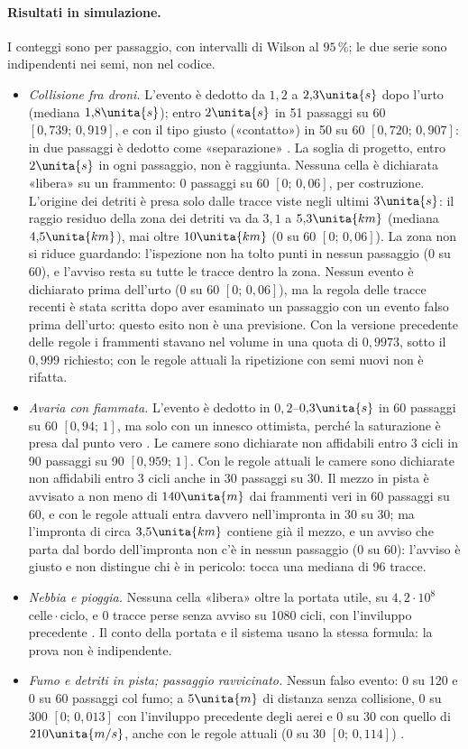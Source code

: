 \paragraph{Risultati in simulazione.} I conteggi sono per passaggio, con intervalli di Wilson al $95\,\%$; le due serie sono indipendenti nei semi, non nel codice.
\begin{itemize}
\item \emph{Collisione fra droni.} L'evento è dedotto da $1{,}2$ a $2{,}3\unita{s}$ dopo l'urto (mediana $1{,}8\unita{s}$); entro $2\unita{s}$ in 51 passaggi su 60 $[0{,}739;\,0{,}919]$, e con il tipo giusto («contatto») in 50 su 60 $[0{,}720;\,0{,}907]$: in due passaggi è dedotto come «separazione» . La soglia di progetto, entro $2\unita{s}$ in ogni passaggio, non è raggiunta. Nessuna cella è dichiarata «libera» su un frammento: 0 passaggi su 60 $[0;\,0{,}06]$, per costruzione. L'origine dei detriti è presa solo dalle tracce viste negli ultimi $3\unita{s}$: il raggio residuo della zona dei detriti va da $3{,}1$ a $5{,}3\unita{km}$ (mediana $4{,}5\unita{km}$), mai oltre $10\unita{km}$ (0 su 60 $[0;\,0{,}06]$). La zona non si riduce guardando: l'ispezione non ha tolto punti in nessun passaggio (0 su 60), e l'avviso resta su tutte le tracce dentro la zona. Nessun evento è dichiarato prima dell'urto (0 su 60 $[0;\,0{,}06]$), ma la regola delle tracce recenti è stata scritta dopo aver esaminato un passaggio con un evento falso prima dell'urto: questo esito non è una previsione. Con la versione precedente delle regole i frammenti stavano nel volume in una quota di $0{,}9973$, sotto il $0{,}999$ richiesto; con le regole attuali la ripetizione con semi nuovi non è rifatta.
\item \emph{Avaria con fiammata.} L'evento è dedotto in $0{,}2$--$0{,}3\unita{s}$ in 60 passaggi su 60 $[0{,}94;\,1]$, ma solo con un innesco ottimista, perché la saturazione è presa dal punto vero . Le camere sono dichiarate non affidabili entro 3 cicli in 90 passaggi su 90 $[0{,}959;\,1]$. Con le regole attuali le camere sono dichiarate non affidabili entro 3 cicli anche in 30 passaggi su 30. Il mezzo in pista è avvisato a non meno di $140\unita{m}$ dai frammenti veri in 60 passaggi su 60, e con le regole attuali entra davvero nell'impronta in 30 su 30; ma l'impronta di circa $3{,}5\unita{km}$ contiene già il mezzo, e un avviso che parta dal bordo dell'impronta non c'è in nessun passaggio (0 su 60): l'avviso è giusto e non distingue chi è in pericolo: tocca una mediana di 96 tracce.
\item \emph{Nebbia e pioggia.} Nessuna cella «libera» oltre la portata utile, su $4{,}2\cdot10^8$ celle\,$\cdot$\,ciclo, e 0 tracce perse senza avviso su 1080 cicli, con l'inviluppo precedente . Il conto della portata e il sistema usano la stessa formula: la prova non è indipendente.
\item \emph{Fumo e detriti in pista; passaggio ravvicinato.} Nessun falso evento: 0 su 120 e 0 su 60 passaggi col fumo; a $5\unita{m}$ di distanza senza collisione, 0 su 300 $[0;\,0{,}013]$ con l'inviluppo precedente degli aerei e 0 su 30 con quello di $210\unita{m/s}$, anche con le regole attuali (0 su 30 $[0;\,0{,}114]$) .
\end{itemize}
